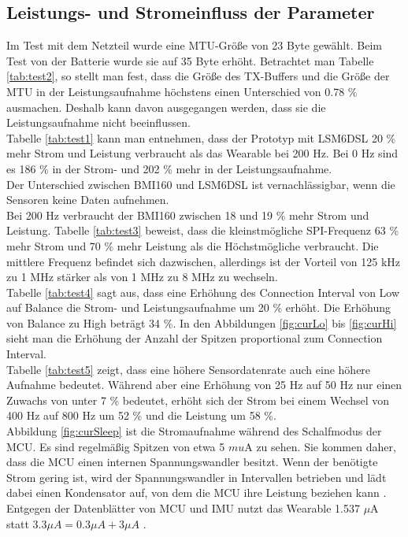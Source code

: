 \subsection{Leistungs- und Stromeinfluss der Parameter}
Im Test mit dem Netzteil wurde eine MTU-Größe von 23 Byte gewählt.
Beim Test von der Batterie wurde sie auf 35 Byte erhöht.
Betrachtet man Tabelle \ref{tab:test2}, so stellt man fest, dass die Größe des TX-Buffers und die Größe der MTU in der Leistungsaufnahme höchstens einen Unterschied von 0.78 \% ausmachen.
Deshalb kann davon ausgegangen werden, dass sie die Leistungsaufnahme nicht beeinflussen.\\
Tabelle \ref{tab:test1} kann man entnehmen, dass der Prototyp mit LSM6DSL 20 \% mehr Strom und Leistung verbraucht als das Wearable bei 200 Hz.
Bei 0 Hz sind es 186 \% in der Strom- und 202 \% mehr in der Leistungsaufnahme.\\
Der Unterschied zwischen BMI160 und LSM6DSL ist vernachlässigbar, wenn die Sensoren keine Daten aufnehmen.\\
Bei 200 Hz verbraucht der BMI160 zwischen 18 und 19 \% mehr Strom und Leistung.
Tabelle \ref{tab:test3} beweist, dass die kleinstmögliche SPI-Frequenz 63 \% mehr Strom und 70 \% mehr Leistung als die Höchstmögliche verbraucht.
Die mittlere Frequenz befindet sich dazwischen, allerdings ist der Vorteil von 125 kHz zu 1 MHz stärker als von 1 MHz zu 8 MHz zu wechseln.\\
Tabelle \ref{tab:test4} sagt aus, dass eine Erhöhung des Connection Interval von Low auf Balance die Strom- und Leistungsaufnahme um 20 \% erhöht.
Die Erhöhung von Balance zu High beträgt 34 \%.
In den Abbildungen \ref{fig:curLo} bis \ref{fig:curHi} sieht man die Erhöhung der Anzahl der Spitzen proportional zum Connection Interval.\\
Tabelle \ref{tab:test5} zeigt, dass eine höhere Sensordatenrate auch eine höhere Aufnahme bedeutet.
Während aber eine Erhöhung von 25 Hz auf 50 Hz nur einen Zuwachs von unter 7 \% bedeutet, erhöht sich der Strom bei einem Wechsel von 400 Hz auf 800 Hz um 52 \% und die Leistung um 58 \%.\\
Abbildung \ref{fig:curSleep} ist die Stromaufnahme während des Schalfmodus der MCU.
Es sind regelmäßig Spitzen von etwa 5 $mu$A zu sehen.
Sie kommen daher, dass die MCU einen internen Spannungswandler besitzt.
Wenn der benötigte Strom gering ist, wird der Spannungswandler in Intervallen betrieben und lädt dabei einen Kondensator auf, von dem die MCU ihre Leistung beziehen kann \cite{site_refreshMode}.
Entgegen der Datenblätter von MCU und IMU nutzt das Wearable 1.537 $\mu$A statt $3.3 \mu{}A = 0.3 \mu{}A + 3 \mu{}A$ \cite{datasheet_lsm6dsl} \cite{datasheet_nrf52832}.\\
